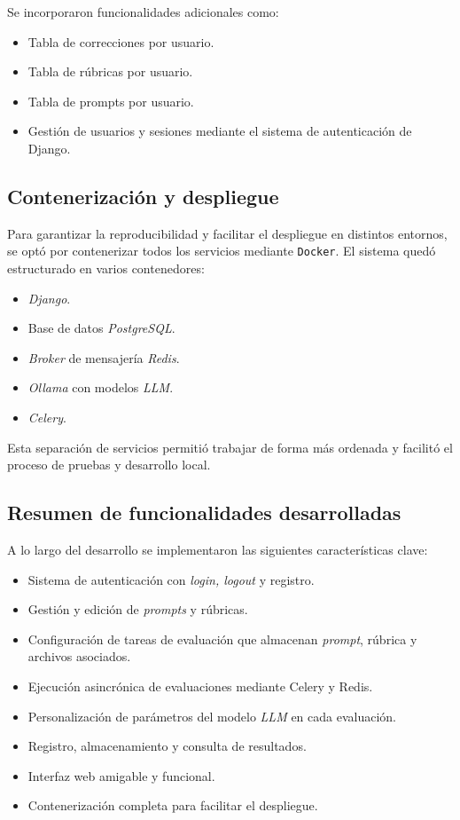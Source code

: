 Se incorporaron funcionalidades adicionales como:
\begin{itemize}
    \item Tabla de correcciones por usuario.
    \item Tabla de rúbricas por usuario.
    \item Tabla de prompts por usuario.
    \item Gestión de usuarios y sesiones mediante el sistema de autenticación de Django.
\end{itemize}

\subsection*{Contenerización y despliegue}

Para garantizar la reproducibilidad y facilitar el despliegue en distintos entornos, se optó por contenerizar todos los servicios mediante \texttt{Docker}. El sistema quedó estructurado en varios contenedores:
\begin{itemize}
    \item \textit{Django}.
    \item Base de datos \textit{PostgreSQL}.
    \item \textit{Broker} de mensajería \textit{Redis}.
    \item \textit{Ollama} con modelos \textit{LLM}.
    \item \textit{Celery}.
\end{itemize}

Esta separación de servicios permitió trabajar de forma más ordenada y facilitó el proceso de pruebas y desarrollo local.

\subsection*{Resumen de funcionalidades desarrolladas}

A lo largo del desarrollo se implementaron las siguientes características clave:

\begin{itemize}
    \item Sistema de autenticación con \textit{login, logout} y registro.
    \item Gestión y edición de \textit{prompts} y rúbricas.
    \item Configuración de tareas de evaluación que almacenan \textit{prompt}, rúbrica y archivos asociados.
    \item Ejecución asincrónica de evaluaciones mediante Celery y Redis.
    \item Personalización de parámetros del modelo \textit{LLM} en cada evaluación.
    \item Registro, almacenamiento y consulta de resultados.
    \item Interfaz web amigable y funcional.
    \item Contenerización completa para facilitar el despliegue.
\end{itemize}

